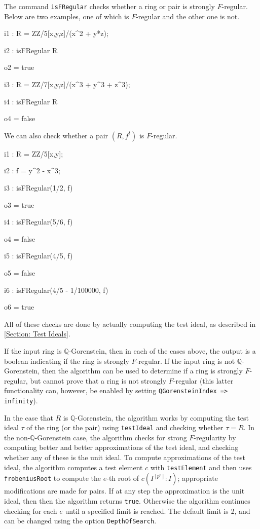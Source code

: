 \documentclass{amsart}
\begin{document}
The command \texttt{isFRegular} checks whether a ring or pair is strongly
$F$-regular. Below are two examples, one of which is $F$-regular and the other one is not.


\medskip
{\small{}
\begin{MyVerbatim}
i1 : R = ZZ/5[x,y,z]/(x^2 + y*z);

i2 : isFRegular R

o2 = true

i3 : R = ZZ/7[x,y,z]/(x^3 + y^3 + z^3);

i4 : isFRegular R

o4 = false
\end{MyVerbatim}
}\medskip

We can also check whether a pair $(R, f^t)$ is $F$-regular.

\medskip
{\small{}
\begin{MyVerbatim}
i1 : R = ZZ/5[x,y];

i2 : f = y^2 - x^3;

i3 : isFRegular(1/2, f)

o3 = true

i4 : isFRegular(5/6, f)

o4 = false

i5 : isFRegular(4/5, f)

o5 = false

i6 : isFRegular(4/5 - 1/100000, f)

o6 = true
\end{MyVerbatim}
}\medskip

All of these checks are done by actually computing the test ideal, as described in \autoref{Section: Test Ideals}.

If the input ring is $\mathbb{Q}$-Gorenstein, then in each of the cases above, the output is a boolean indicating if the
ring is strongly $F$-regular. If the input ring is not
$\mathbb{Q}$-Gorenstein, then the algorithm can be used to determine if a
ring is strongly $F$-regular, but cannot prove that a ring is not strongly
$F$-regular (this latter functionality can, however, be enabled by setting \texttt{QGorensteinIndex => infinity}).


In the case that $R$ is $\mathbb{Q}$-Gorenstein, the algorithm works by
computing the test ideal $\tau$ of the ring  (or the pair) using \texttt{testIdeal}
and checking whether $\tau=R$.
In the non-$\mathbb{Q}$-Gorenstein case, the algorithm checks for
strong $F$-regularity by computing better and
better approximations of the test ideal, and checking whether any of these is the unit ideal.
To compute approximations of the
test ideal, the algorithm computes a test element $c$ with \texttt{testElement}
and then uses \texttt{frobeniusRoot} to compute the $e$-th root of
$c(I^{[p^{e}]} : I)$; appropriate modifications are made for pairs. If at
any step the approximation is the unit ideal, then then the algorithm
returns \texttt{true}. Otherwise the algorithm continues checking for each $e$
until a specified limit is reached. The default limit is 2, and can be
changed using the option \texttt{DepthOfSearch}.
\end{document}
